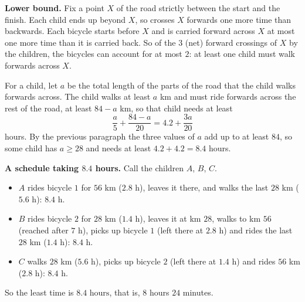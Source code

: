 \textbf{Lower bound.} Fix a point $X$ of the road strictly between the start and the finish. Each child ends up beyond $X$, so crosses $X$ forwards one more time than backwards. Each bicycle starts before $X$ and is carried forward across $X$ at most one more time than it is carried back. So of the $3$ (net) forward crossings of $X$ by the children, the bicycles can account for at most $2$: at least one child must walk forwards across $X$.

For a child, let $a$ be the total length of the parts of the road that the child walks forwards across. The child walks at least $a$ km and must ride forwards across the rest of the road, at least $84-a$ km, so that child needs at least
\[
\dfrac{a}{5}+\dfrac{84-a}{20}=4.2+\dfrac{3a}{20}
\]
hours. By the previous paragraph the three values of $a$ add up to at least $84$, so some child has $a\ge28$ and needs at least $4.2+4.2=8.4$ hours.

\textbf{A schedule taking $8.4$ hours.} Call the children $A$, $B$, $C$.
\begin{itemize}
\item $A$ rides bicycle $1$ for $56$ km ($2.8$ h), leaves it there, and walks the last $28$ km ($5.6$ h): $8.4$ h.
\item $B$ rides bicycle $2$ for $28$ km ($1.4$ h), leaves it at km $28$, walks to km $56$ (reached after $7$ h), picks up bicycle $1$ (left there at $2.8$ h) and rides the last $28$ km ($1.4$ h): $8.4$ h.
\item $C$ walks $28$ km ($5.6$ h), picks up bicycle $2$ (left there at $1.4$ h) and rides $56$ km ($2.8$ h): $8.4$ h.
\end{itemize}
So the least time is $\boxed{8.4\text{ hours}}$, that is, $8$ hours $24$ minutes.

